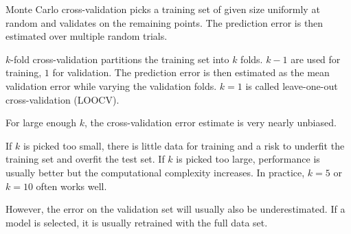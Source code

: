 Monte Carlo cross-validation picks a training set of
given size uniformly at random and validates on the
remaining points.
The prediction error is then estimated over multiple
random trials.

$k$-fold cross-validation partitions the training set
into $k$ folds.
$k - 1$ are used for training, $1$ for validation.
The prediction error is then estimated as the mean
validation error while varying the validation folds.
$k = 1$ is called leave-one-out cross-validation (LOOCV).

For large enough $k$, the cross-validation error estimate
is very nearly unbiased.

If $k$ is picked too small, there is little data for
training and a risk to underfit the training set and
overfit the test set.
If $k$ is picked too large, performance is usually better
but the computational complexity increases.
In practice, $k = 5$ or $k = 10$ often works well.

However, the error on the validation set will usually
also be underestimated.
If a model is selected, it is usually retrained with
the full data set.
